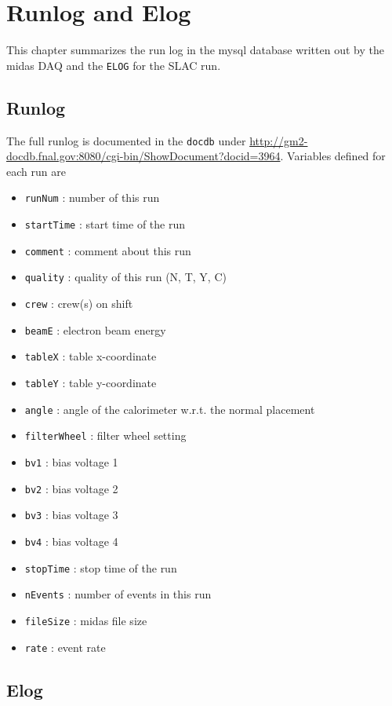 \chapter{Runlog and Elog}
\label{chap:runlog}

This chapter summarizes the run log in the mysql database written out by the \ac{midas} DAQ and the \verb+ELOG+ for the SLAC run.

\section{Runlog}

The full runlog is documented in the \verb+docdb+ under \url{http://gm2-docdb.fnal.gov:8080/cgi-bin/ShowDocument?docid=3964}.
Variables defined for each run are

\begin{itemize}
\item \verb+runNum+ : number of this run
\item \verb+startTime+ : start time of the run
\item \verb+comment+ : comment about this run 
\item \verb+quality+ : quality of this run (N, T, Y, C)
\item \verb+crew+ : crew(s) on shift 
\item \verb+beamE+ : electron beam energy 
\item \verb+tableX+ : table x-coordinate
\item \verb+tableY+ : table y-coordinate
\item \verb+angle+ : angle of the calorimeter w.r.t. the normal placement
\item \verb+filterWheel+ : filter wheel setting
\item \verb+bv1+ : bias voltage 1
\item \verb+bv2+ : bias voltage 2 
\item \verb+bv3+ : bias voltage 3 
\item \verb+bv4+ : bias voltage 4 
\item \verb+stopTime+ : stop time of the run
\item \verb+nEvents+ : number of events in this run
\item \verb+fileSize+ : midas file size
\item \verb+rate+ : event rate
\end{itemize}

\section{Elog}


